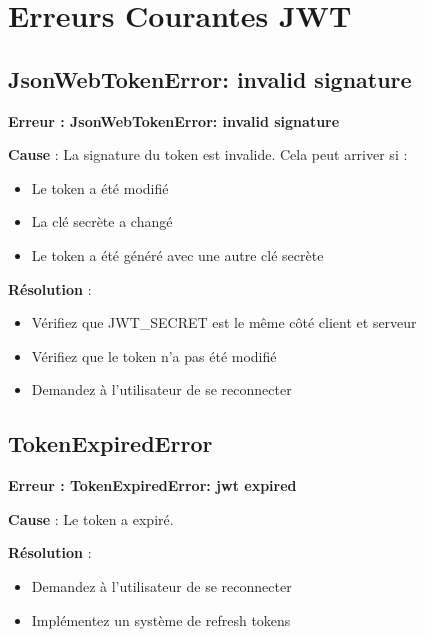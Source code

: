 \section{Erreurs Courantes JWT}

\subsection{JsonWebTokenError: invalid signature}

\begin{errorbox}
    \textbf{Erreur : JsonWebTokenError: invalid signature}
    
    \textbf{Cause} : La signature du token est invalide. Cela peut arriver si :
    \begin{itemize}
        \item Le token a été modifié
        \item La clé secrète a changé
        \item Le token a été généré avec une autre clé secrète
    \end{itemize}
    
    \textbf{Résolution} :
    \begin{itemize}
        \item Vérifiez que JWT\_SECRET est le même côté client et serveur
        \item Vérifiez que le token n'a pas été modifié
        \item Demandez à l'utilisateur de se reconnecter
    \end{itemize}
\end{errorbox}

\subsection{TokenExpiredError}

\begin{errorbox}
    \textbf{Erreur : TokenExpiredError: jwt expired}
    
    \textbf{Cause} : Le token a expiré.
    
    \textbf{Résolution} :
    \begin{itemize}
        \item Demandez à l'utilisateur de se reconnecter
        \item Implémentez un système de refresh tokens
    \end{itemize}
\end{errorbox}

